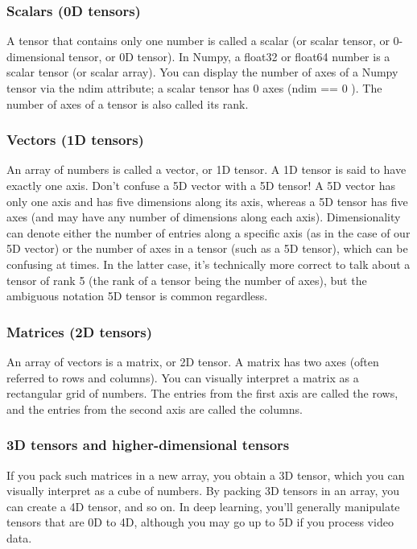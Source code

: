 \documentclass{article}
\numberwithin{equation}{section} %
\begin{document}
\subsubsection{Scalars (0D tensors)}

A tensor that contains only one number is called a scalar (or scalar tensor, or 0-dimensional tensor, or 0D tensor). In Numpy, a float32 or float64 number is a scalar tensor (or scalar array). You can display the number of axes of a Numpy tensor via the ndim attribute; a scalar tensor has 0 axes (ndim == 0 ). The number of axes of a tensor is also called its rank. \\

\subsubsection{Vectors (1D tensors)}

An array of numbers is called a vector, or 1D tensor. A 1D tensor is said to have exactly one axis. Don’t confuse a 5D vector with a 5D tensor! A 5D vector has only one axis and has five dimensions along its axis, whereas a 5D tensor has five axes (and may have any number of dimensions along each axis). Dimensionality can denote either the number of entries along a specific axis (as in the case of our 5D vector) or the number of axes in a tensor (such as a 5D tensor), which can be confusing at times. In the latter case, it’s technically more correct to talk about a tensor of rank 5 (the rank of a tensor being the number of axes), but the ambiguous notation 5D tensor is common regardless. \\

\subsubsection{Matrices (2D tensors)}

An array of vectors is a matrix, or 2D tensor. A matrix has two axes (often referred to rows and columns). You can visually interpret a matrix as a rectangular grid of numbers. The entries from the first axis are called the rows, and the entries from the second axis are called the columns. \\

\subsubsection{3D tensors and higher-dimensional tensors}

If you pack such matrices in a new array, you obtain a 3D tensor, which you can visually interpret as a cube of numbers. By packing 3D tensors in an array, you can create a 4D tensor, and so on. In deep learning, you’ll generally manipulate tensors that are 0D to 4D, although you may go up to 5D if you process video data. \\
\end{document}
